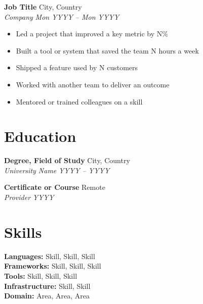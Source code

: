 \documentclass[11pt,letterpaper]{article}
\newcommand{\role}[4]{%
  \noindent\textbf{#1} \hfill #4 \\
  \textit{#2} \hfill \textit{#3}\par
}
\begin{document}
\role{Job Title}{Company}{Mon YYYY -- Mon YYYY}{City, Country}
\begin{itemize}
  \item Led a project that improved a key metric by N\%
  \item Built a tool or system that saved the team N hours a week
  \item Shipped a feature used by N customers
  \item Worked with another team to deliver an outcome
  \item Mentored or trained colleagues on a skill
\end{itemize}

\section{Education}

\noindent\textbf{Degree, Field of Study} \hfill City, Country \\
\textit{University Name} \hfill \textit{YYYY -- YYYY}
\vspace{4pt}

\noindent\textbf{Certificate or Course} \hfill Remote \\
\textit{Provider} \hfill \textit{YYYY}

\section{Skills}

\noindent\textbf{Languages:} Skill, Skill, Skill \\
\textbf{Frameworks:} Skill, Skill, Skill \\
\textbf{Tools:} Skill, Skill, Skill \\
\textbf{Infrastructure:} Skill, Skill \\
\textbf{Domain:} Area, Area, Area
\end{document}
